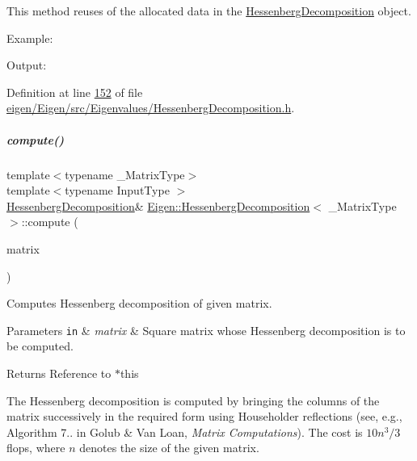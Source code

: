 This method reuses of the allocated data in the \hyperlink{group___eigenvalues___module_class_eigen_1_1_hessenberg_decomposition}{Hessenberg\+Decomposition} object.

Example\+: 
\begin{DoxyCodeInclude}
\end{DoxyCodeInclude}
 Output\+: 
\begin{DoxyVerbInclude}
\end{DoxyVerbInclude}
 

Definition at line \hyperlink{eigen_2_eigen_2src_2_eigenvalues_2_hessenberg_decomposition_8h_source_l00152}{152} of file \hyperlink{eigen_2_eigen_2src_2_eigenvalues_2_hessenberg_decomposition_8h_source}{eigen/\+Eigen/src/\+Eigenvalues/\+Hessenberg\+Decomposition.\+h}.

\mbox{\label{group___eigenvalues___module_a239a6fd42c57aab3c0b048c47fde3004}} 
\subparagraph{\texorpdfstring{compute()}{compute()}\hspace{0.1cm}{\footnotesize\ttfamily [2/2]}}
{\footnotesize\ttfamily template$<$typename \+\_\+\+Matrix\+Type$>$ \\
template$<$typename Input\+Type $>$ \\
\hyperlink{group___eigenvalues___module_class_eigen_1_1_hessenberg_decomposition}{Hessenberg\+Decomposition}\& \hyperlink{group___eigenvalues___module_class_eigen_1_1_hessenberg_decomposition}{Eigen\+::\+Hessenberg\+Decomposition}$<$ \+\_\+\+Matrix\+Type $>$\+::compute (\begin{DoxyParamCaption}\item[{const \hyperlink{group___core___module_struct_eigen_1_1_eigen_base}{Eigen\+Base}$<$ Input\+Type $>$ \&}]{matrix }\end{DoxyParamCaption})\hspace{0.3cm}{\ttfamily [inline]}}



Computes Hessenberg decomposition of given matrix. 


\begin{DoxyParams}[1]{Parameters}
\mbox{\tt in}  & {\em matrix} & Square matrix whose Hessenberg decomposition is to be computed. \\
\hline
\end{DoxyParams}
\begin{DoxyReturn}{Returns}
Reference to {\ttfamily $\ast$this} 
\end{DoxyReturn}
The Hessenberg decomposition is computed by bringing the columns of the matrix successively in the required form using Householder reflections (see, e.\+g., Algorithm 7.. in Golub \& Van Loan, {\itshape Matrix Computations}). The cost is $ 10n^3/3 $ flops, where $ n $ denotes the size of the given matrix.

